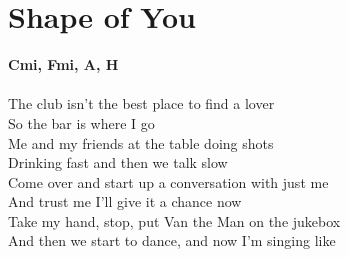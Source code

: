 \section{Shape of You}
\footnotesize\textbf{C\kr mi, F\kr mi, A, H\6}\\
\normalsize
\\
The club isn't the best place to find a lover\\
So the bar is where I go\\
Me and my friends at the table doing shots\\
Drinking fast and then we talk slow\\
Come over and start up a conversation with just me\\
And trust me I'll give it a chance now\\
Take my hand, stop, put Van the Man on the jukebox\\
And then we start to dance, and now I'm singing like\\
\setlength{\columnseprule}{1pt}
